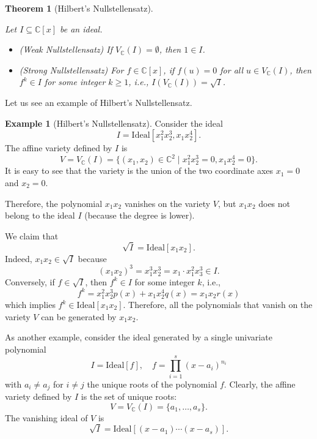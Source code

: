 \documentclass[
]{book}
\newtheorem{theorem}{Theorem}[chapter]
\theoremstyle{definition}
\theoremstyle{definition}
\newtheorem{example}{Example}[chapter]
\theoremstyle{definition}
\theoremstyle{definition}
\theoremstyle{remark}
\begin{document}
\begin{theorem}[Hilbert's Nullstellensatz]
\protect\hypertarget{thm:HilbertNull}{}\label{thm:HilbertNull}

Let \(I \subseteq \mathbb{C}[x]\) be an ideal.

\begin{itemize}
\item
  (Weak Nullstellensatz) If \(V_{\mathbb{C}}(I) = \emptyset\), then \(1 \in I\).
\item
  (Strong Nullstellensatz) For \(f \in \mathbb{C}[x]\), if \(f(u) = 0\) for all \(u \in V_{\mathbb{C}}(I)\), then \(f^k \in I\) for some integer \(k \geq 1\), i.e., \(I(V_{\mathbb{C}}(I)) = \sqrt{I}\).
\end{itemize}

\end{theorem}

Let us see an example of Hilbert's Nullstellensatz.

\begin{example}[Hilbert's Nullstellensatz]
\protect\hypertarget{exm:HilbertNullstellensatz}{}\label{exm:HilbertNullstellensatz}Consider the ideal
\[
I=\mathrm{Ideal}[x_1^2 x_2^3, x_1 x_2^4].
\]
The affine variety defined by \(I\) is
\[
V = V_{\mathbb{C}}(I) = \{ (x_1,x_2) \in \mathbb{C}^2 \mid x_1^2 x_2^3 = 0, x_1 x_2^4=0 \}.
\]
It is easy to see that the variety is the union of the two coordinate axes \(x_1=0\) and \(x_2 = 0\).

Therefore, the polynomial \(x_1x_2\) vanishes on the variety \(V\), but \(x_1 x_2\) does not belong to the ideal \(I\) (because the degree is lower).

We claim that
\[
\sqrt{I} = \mathrm{Ideal}[x_1 x_2].
\]
Indeed, \(x_1 x_2 \in \sqrt{I}\) because
\[
(x_1x_2)^3 = x_1^3 x_2^3 = x_1 \cdot x_1^2 x_3^3 \in I.
\]
Conversely, if \(f \in \sqrt{I}\), then \(f^k \in I\) for some integer \(k\), i.e.,
\[
f^k = x_1^2 x_2^3 p(x) + x_1 x_2^4 q(x) = x_1 x_2 r(x)
\]
which implies \(f^k \in \mathrm{Ideal}[x_1 x_2]\). Therefore, all the polynomials that vanish on the variety \(V\) can be generated by \(x_1 x_2\).

As another example, consider the ideal generated by a single univariate polynomial
\[
I = \mathrm{Ideal}[f], \quad f = \prod_{i=1}^{s} (x - a_i)^{n_i}
\]
with \(a_i \neq a_j\) for \(i \neq j\) the unique roots of the polynomial \(f\). Clearly, the affine variety defined by \(I\) is the set of unique roots:
\[
V= V_{\mathbb{C}}(I) = \{a_1,\dots,a_s\}.
\]
The vanishing ideal of \(V\) is
\[
\sqrt{I} = \mathrm{Ideal}[(x-a_1)\cdots (x-a_s)].
\]
\end{example}
\end{document}
